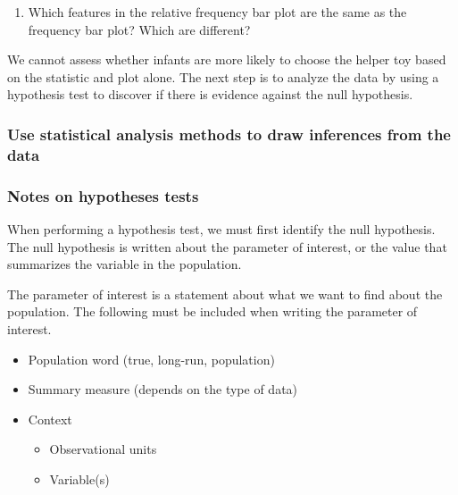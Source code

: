 \documentclass[
]{report}
\providecommand{\tightlist}{%
  \setlength{\itemsep}{0pt}\setlength{\parskip}{0pt}}
\begin{document}
\begin{enumerate}
\def\labelenumi{\arabic{enumi}.}
\setcounter{enumi}{3}
\tightlist
\item
  Which features in the relative frequency bar plot are the same as the frequency bar plot? Which are different?
\end{enumerate}

\vspace{0.5in}

We cannot assess whether infants are more likely to choose the helper toy based on the statistic and plot alone. The next step is to analyze the data by using a hypothesis test to discover if there is evidence against the null hypothesis.

\subsubsection*{Use statistical analysis methods to draw inferences from the data}\label{use-statistical-analysis-methods-to-draw-inferences-from-the-data}

\subsubsection*{Notes on hypotheses tests}\label{notes-on-hypotheses-tests}

\vspace{2in}

When performing a hypothesis test, we must first identify the null hypothesis. The null hypothesis is written about the parameter of interest, or the value that summarizes the variable in the population.

The parameter of interest is a statement about what we want to find about the population. The following must be included when writing the parameter of interest.

\begin{itemize}
\item
  Population word (true, long-run, population)
\item
  Summary measure (depends on the type of data)
\item
  Context

  \begin{itemize}
  \item
    Observational units
  \item
    Variable(s)
  \end{itemize}
\end{itemize}
\end{document}
